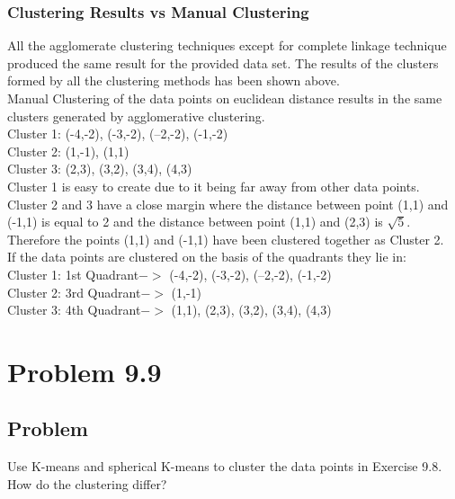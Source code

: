 \documentclass[12pt]{report}
\begin{document}
\subsection{Clustering Results vs Manual Clustering }
All the agglomerate clustering techniques except for complete linkage technique produced the same result for the provided data set. The results of the clusters formed by all the clustering methods has been shown above.\\
Manual Clustering of the data points on euclidean distance results in the same clusters generated by agglomerative clustering.\\
Cluster 1: (-4,-2), (-3,-2), (--2,-2), (-1,-2)\\
Cluster 2: (1,-1), (1,1)\\
Cluster 3: (2,3), (3,2), (3,4), (4,3)\\
Cluster 1 is easy to create due to it being far away from other data points. Cluster 2 and 3 have a close margin where the distance between point (1,1) and (-1,1) is equal to 2 and the distance between point (1,1) and (2,3) is $\sqrt{5}$. Therefore the points (1,1) and (-1,1) have been clustered together as Cluster 2.\\
If the data points are clustered on the basis of the quadrants they lie in:\\
Cluster 1: 1st Quadrant$ ->$ (-4,-2), (-3,-2), (--2,-2), (-1,-2)\\
Cluster 2: 3rd Quadrant$ ->$ (1,-1)\\
Cluster 3:  4th Quadrant$ ->$ (1,1), (2,3), (3,2), (3,4), (4,3)\\
\chapter{Problem 9.9}
\section{Problem}
Use K-means and spherical K-means to cluster the data points in Exercise 9.8. How do the clustering differ?
\end{document}
